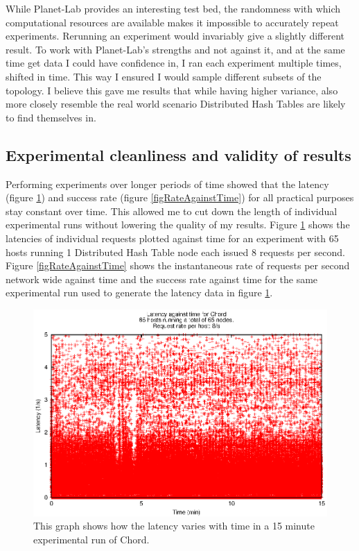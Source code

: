 While Planet-Lab provides an interesting test bed, the randomness with which computational resources are available makes it impossible to accurately repeat experiments. Rerunning an experiment would invariably give a slightly different result.
To work with Planet-Lab's strengths and not against it, and at the same time get data I could have confidence in, I ran each experiment multiple times, shifted in time. This way I ensured I would sample different subsets of the topology. I believe this gave me results that while having higher variance, also more closely resemble the real world scenario Distributed Hash Tables are likely to find themselves in.

\subsection{Experimental cleanliness and validity of results}
Performing experiments over longer periods of time showed that the latency (figure \ref{figLatencyAgainstTime}) and success rate (figure \ref{figRateAgainstTime}) for all practical purposes stay constant over time.
This allowed me to cut down the length of individual experimental runs without lowering the quality of my results.
Figure \ref{figLatencyAgainstTime} shows the latencies of individual requests plotted against time for an experiment with 65 hosts running 1 Distributed Hash Table node each issued 8 requests per second.
Figure \ref{figRateAgainstTime} shows the instantaneous rate of requests per second network wide against time and the success rate against time for the same experimental run used to generate the latency data in figure \ref{figLatencyAgainstTime}. 

\begin{figure}[!htbp]
  \begin{center}
    \includegraphics[width=0.9\linewidth]{illustrations/latency_aginst_time_chord.eps}
    \caption{This graph shows how the latency varies with time in a 15 minute experimental run of Chord.}
    \label{figLatencyAgainstTime}
  \end{center}
\end{figure}

